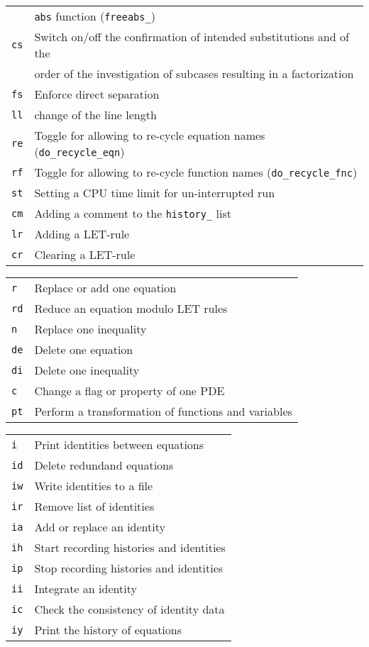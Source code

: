 \begin{longtable}[l]{ll}
  & \texttt{abs} function (\texttt{freeabs\_}) \\
  \texttt{cs} & Switch on/off the confirmation of intended substitutions and of the \\
  & order of the investigation of subcases resulting in a factorization \\
  \texttt{fs} & Enforce direct separation \\
  \texttt{ll} & change of the line length \\
  \texttt{re} & Toggle for allowing to re-cycle equation names (\texttt{do\_recycle\_eqn}) \\
  \texttt{rf} & Toggle for allowing to re-cycle function names (\texttt{do\_recycle\_fnc}) \\
  \texttt{st} & Setting a CPU time limit for un-interrupted run \\
  \texttt{cm} & Adding a comment to the \texttt{history\_} list \\
  \texttt{lr} & Adding a LET-rule \\
  \texttt{cr} & Clearing a LET-rule
\end{longtable}


\begin{longtable}[l]{ll}
  \texttt{r}  & Replace or add one equation \\
  \texttt{rd} & Reduce an equation modulo LET rules \\
  \texttt{n}  & Replace one inequality \\
  \texttt{de} & Delete one equation \\
  \texttt{di} & Delete one inequality \\
  \texttt{c}  & Change a flag or property of one PDE \\
  \texttt{pt} & Perform a transformation of functions and variables
\end{longtable}


\begin{longtable}[l]{ll}
  \texttt{i}  & Print identities between equations \\
  \texttt{id} & Delete redundand equations \\
  \texttt{iw} & Write identities to a file \\
  \texttt{ir} & Remove list of identities \\
  \texttt{ia} & Add or replace an identity \\
  \texttt{ih} & Start recording histories and identities \\
  \texttt{ip} & Stop recording histories and identities \\
  \texttt{ii} & Integrate an identity \\
  \texttt{ic} & Check the consistency of identity data \\
  \texttt{iy} & Print the history of equations
\end{longtable}

